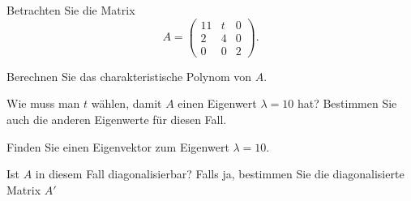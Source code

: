 Betrachten Sie die Matrix
\[
A=\begin{pmatrix}11&t & 0\\2 & 4 & 0 \\ 0 & 0 & 2\end{pmatrix}.
\]

\begin{teilaufgaben}
\item
Berechnen Sie das charakteristische Polynom von $A$.
\item
Wie muss man $t$ wählen, damit $A$ einen Eigenwert $\lambda = 10$ hat? 
Bestimmen Sie auch die anderen Eigenwerte für diesen Fall.
\item
Finden Sie einen Eigenvektor zum Eigenwert $\lambda = 10$.
\item
Ist $A$ in diesem Fall diagonalisierbar? 
Falls ja, bestimmen Sie die diagonalisierte Matrix $A'$
\end{teilaufgaben}


